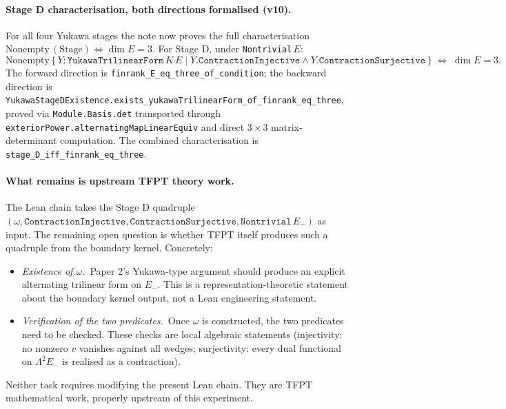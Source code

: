 \paragraph{Stage D characterisation, both directions formalised (v10).}
For all four Yukawa stages the note now proves the full
characterisation
$\text{Nonempty}\,(\text{Stage}) \iff \dim E = 3$.
For Stage D, under \texttt{Nontrivial}\,$E$:
\[
\text{Nonempty}\,\bigl\{\,Y : \texttt{YukawaTrilinearForm}\,K\,E
  \;\big|\; Y.\texttt{ContractionInjective}
  \land Y.\texttt{ContractionSurjective}\,\bigr\}
\;\iff\;
\dim E = 3.
\]
The forward direction is
\texttt{finrank\_E\_eq\_three\_of\_condition}; the backward
direction is \texttt{YukawaStageDExistence.exists\_yukawaTrilinearForm\_of\_finrank\_eq\_three},
proved via \texttt{Module.Basis.det} transported through
\texttt{exteriorPower.alternatingMapLinearEquiv} and direct
$3\times 3$ matrix-determinant computation. The combined
characterisation is \texttt{stage\_D\_iff\_finrank\_eq\_three}.

\paragraph{What remains is upstream TFPT theory work.}
The Lean chain takes the Stage D quadruple
$(\omega, \texttt{ContractionInjective},
\texttt{ContractionSurjective}, \texttt{Nontrivial}\,E_-)$
as input. The remaining open question is whether TFPT itself
produces such a quadruple from the boundary kernel. Concretely:

\begin{itemize}[leftmargin=1.6em, itemsep=1pt]
\item \emph{Existence of $\omega$.}\ Paper 2's Yukawa-type
    argument should produce an explicit alternating trilinear
    form on $E_-$. This is a representation-theoretic statement
    about the boundary kernel output, not a Lean engineering
    statement.
\item \emph{Verification of the two predicates.}\ Once $\omega$
    is constructed, the two predicates need to be checked.
    These checks are local algebraic statements (injectivity:
    no nonzero $v$ vanishes against all wedges; surjectivity:
    every dual functional on $\Lambda^2 E_-$ is realised as a
    contraction).
\end{itemize}

Neither task requires modifying the present Lean chain. They are
TFPT mathematical work, properly upstream of this experiment.

